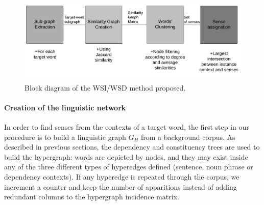 \begin{figure}
\centering
\includegraphics[width=1\linewidth]{images/Chapitre4/wsd_wsi_process.png}
\caption{Block diagram of the WSI/WSD method proposed.}
\label{fig:wsd_wsi_process}
\end{figure}


\paragraph{Creation of the linguistic network}


In order to find senses from the contexts of a target word, the first step in our procedure is to build a linguistic graph $G_H$ from a background corpus. As described in previous sections, the dependency and constituency trees are used to build the hypergraph: words are depicted by nodes, and they may exist inside any of the three different types of hyperedges defined (sentence,  noun phrase or dependency contexts). If any  hyperedge is repeated through the corpus, we increment a counter and keep the number of apparitions instead of adding redundant columns to the hypergraph incidence matrix.

